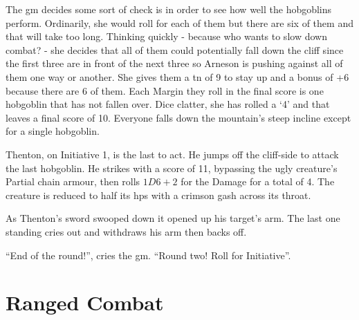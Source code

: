 \begin{multicols}{2}
{\begin{exampletext}
	The \gls{gm} decides some sort of check is in order to see how well the hobgoblins perform.
	Ordinarily, she would roll for each of them but there are six of them and that will take too long.
	Thinking quickly - because who wants to slow down combat? - she decides that all of them could potentially fall down the cliff since the first three are in front of the next three so Arneson is pushing against all of them one way or another.
	She gives them a \gls{tn} of 9 to stay up and a bonus of +6 because there are 6 of them.
	Each Margin they roll in the final score is one hobgoblin that has not fallen over.
	Dice clatter, she has rolled a `4' and that leaves a final score of 10.
	Everyone falls down the mountain's steep incline except for a single hobgoblin.

	Thenton, on Initiative 1, is the last to act.
	He jumps off the cliff-side to attack the last hobgoblin.
	He strikes with a score of 11, bypassing the ugly creature's Partial chain armour, then rolls $1D6+2$ for the Damage for a total of 4.
	The creature is reduced to half its \glspl{hp} with a crimson gash across its throat.

	As Thenton's sword swooped down it opened up his target's arm. The last one standing cries out and withdraws his arm then backs off.

	``End of the \gls{round}!'', cries the \gls{gm}. ``Round two! Roll for Initiative''.
\end{exampletext}
}{}

\end{multicols}

\section{Ranged Combat}

